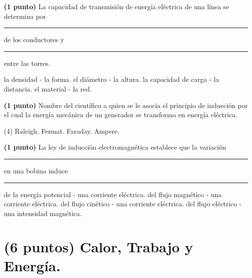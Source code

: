 \documentclass[12pt, letter]{exam}
\begin{document}
\begin{questions}
    \newpage

    \question \textbf{(1 punto)} La capacidad de transmisión de energía eléctrica de una línea se determina por \rule{2cm}{0.1mm} de los conductores y \rule{2cm}{0.1mm} entre las torres.
    \begin{multicols}{2}
    \begin{tasks}
        \task la densidad - la forma.
        \task el diámetro - la altura.
        \task la capacidad de carga - la distancia.
        \task el material - la red.
    \end{tasks}
    \end{multicols}
    \question \textbf{(1 punto)} Nombre del científico a quien se le asocia el principio de inducción por el cual la energía mecánica de un generador se transforma en energía eléctrica.
    \begin{tasks}(4)
        \task Raleigh.
        \task Fermat.
        \task Faraday.
        \task Ampere.
    \end{tasks}
    \question \textbf{(1 punto)} La ley de inducción electromagnética establece que la variación \rule{2cm}{0.1mm} en una bobina induce \rule{2cm}{0.1mm}
    \begin{tasks}
        \task de la energía potencial - una corriente eléctrica.
        \task del flujo magnético - una corriente eléctrica.
        \task del flujo cinético - una corriente eléctrica.
        \task del flujo eléctrico - una intensidad magnética.
    \end{tasks}
    
    \section{(6 puntos) Calor, Trabajo y Energía.}
    

\end{questions}
\end{document}
